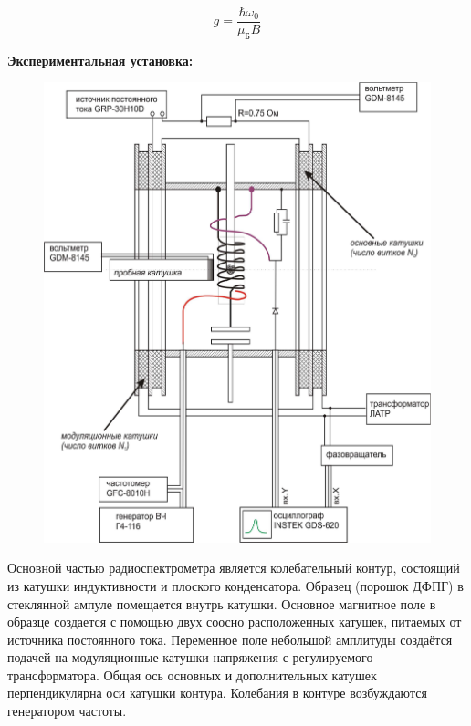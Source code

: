 \documentclass[a4paper, 12pt]{article}%
\begin{document}
\[ g = \frac{\hbar \omega_0}{\mu_\text{Б} B}\]

\textbf{Экспериментальная установка:}\\\par

	\begin{figure}[h!]
	    \centering
		\includegraphics[scale=0.17]{Схема.png}
	\end{figure}

	Основной частью радиоспектрометра является колебательный контур,  состоящий из катушки индуктивности и плоского конденсатора.  Образец (порошок ДФПГ) в стеклянной ампуле помещается внутрь катушки.  Основное магнитное поле в образце создается с помощью двух соосно расположенных катушек,  питаемых от источника постоянного тока. 
Переменное поле небольшой амплитуды создаётся подачей на модуляционные катушки напряжения с регулируемого трансформатора.  Общая ось основных и дополнительных катушек перпендикулярна оси катушки контура. Колебания в контуре возбуждаются генератором частоты. \\

\newpage
	
\end{document}
